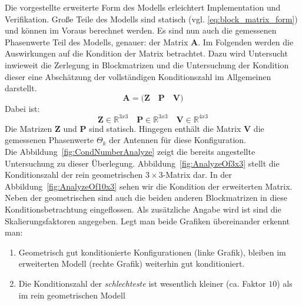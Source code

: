 Die vorgestellte erweiterte Form des Modells erleichtert Implementation und Verifikation. Große Teile des Modells sind statisch (vgl. \ref{eq:block_matrix_form}) und können im Voraus berechnet werden. Es sind nun auch die gemessenen Phasenwerte Teil des Modells, genauer: der Matrix $\mathbf{A}$. Im Folgenden werden die Auswirkungen auf die Kondition der Matrix betrachtet. Dazu wird Untersucht inwieweit die Zerlegung in Blockmatrizen und die Untersuchung der Kondition dieser eine Abschätzung der vollständigen Konditionszahl im Allgemeinen darstellt. 
%
\begin{equation}
\label{eq:block_matrix_form}
\mathbf{A}=\bigg( \mathbf{Z}\quad \mathbf{P}\quad \mathbf{V}\bigg)
\end{equation}
%
Dabei ist:
\begin{equation}
\mathbf{Z} \in \mathbb{R}^{3x3} \quad \mathbf{P} \in \mathbb{R}^{3x3} \quad \mathbf{V}\in \mathbb{R}^{4x3}
\end{equation}
%
Die Matrizen $\mathbf{Z}$ und $\mathbf{P}$ sind statisch. Hingegen enthält die Matrix $\mathbf{V}$ die gemessenen Phasenwerte $\Theta_k$ der Antennen für diese Konfiguration. \\
%
Die Abbildung~\ref{fig:CondNumberAnalyze} zeigt die bereits angestellte Untersuchung zu dieser Überlegung. Abbildung~\ref{fig:AnalyzeOf3x3} stellt die Konditionszahl der rein geometrischen $3\times3$-Matrix dar. In der Abbildung~\ref{fig:AnalyzeOf10x3} sehen wir die Kondition der erweiterten Matrix. Neben der geometrischen sind auch die beiden anderen Blockmatrizen in diese Konditionsbetrachtung eingeflossen. Als zusätzliche Angabe wird ist sind die Skalierungsfaktoren angegeben. Legt man beide Grafiken übereinander erkennt man:
\begin{enumerate}
\item Geometrisch gut konditionierte Konfigurationen (linke Grafik), bleiben im erweiterten Modell (rechte Grafik) weiterhin gut konditioniert.
\item Die Konditionszahl der \textit{schlechteste} ist wesentlich kleiner (ca. Faktor $10$) als im rein geometrischen Modell
\end{enumerate}
%

